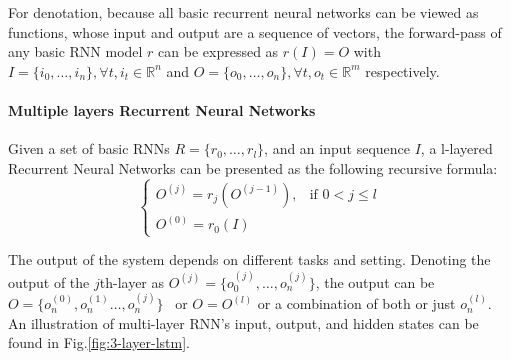 For denotation, because all basic recurrent neural networks can be viewed as functions, whose input and output are a sequence of vectors, the forward-pass of any basic RNN model \(r\) can be expressed as \(r(I) = O\) with \(I = \{i_0,\ldots,i_n\}, \forall t, i_t \in \mathbb{R}^n\) and \(O = \{o_0,\ldots,o_n\}, \forall t, o_t \in \mathbb{R}^m\) respectively.

\paragraph{Multiple layers Recurrent Neural Networks}\label{sec:multilayer-lstm}
Given a set of basic RNNs \(R = \{r_0,\ldots,r_l\}\), and an input sequence \(I\), a l-layered Recurrent Neural Networks can be presented as the following recursive formula:
\begin{equation}
    \begin{cases}
    O^{(j)} = r_j(O^{(j-1)}), & \mbox{if }  0 < j \leq l\\
    O^{(0)} = r_0(I)
    \end{cases}
\end{equation}

The output of the system depends on different tasks and setting.
Denoting the output of the \(j\)th-layer as  \(O^{(j)} = \{o^{(j)}_0,\ldots,o^{(j)}_n\}\), the output can be \(O= \{o^{(0)}_n, o^{(1)}_n\ldots,o^{(j)}_n\}\)~\cite{treeLSTM} or \(O = O^{(l)}\) or a combination of both or just \(o^{(l)}_n\).
An illustration of multi-layer RNN's input, output, and hidden states can be found in Fig.\ref{fig:3-layer-lstm}.

